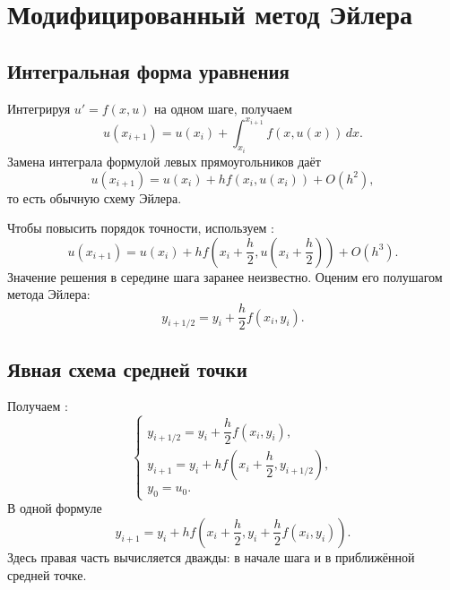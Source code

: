 \documentclass[../final.tex]{subfiles}
\begin{document}
\section{Модифицированный метод Эйлера}

\subsection{Интегральная форма уравнения}

Интегрируя $u'=f(x,u)$ на одном шаге, получаем
\begin{equation*}
    u(x_{i+1})=u(x_i)+\int_{x_i}^{x_{i+1}}f(x,u(x))\,dx.
\end{equation*}
Замена интеграла формулой левых прямоугольников даёт
\begin{equation*}
    u(x_{i+1})=u(x_i)+h f(x_i,u(x_i))+O(h^2),
\end{equation*}
то есть обычную схему Эйлера.

Чтобы повысить порядок точности, используем :
\begin{equation*}
    u(x_{i+1})=u(x_i)
    +h f\!\left(x_i+\frac h2,u\!\left(x_i+\frac h2\right)\right)
    +O(h^3).
\end{equation*}
Значение решения в середине шага заранее неизвестно. Оценим его
полушагом метода Эйлера:
\begin{equation*}
    y_{i+1/2}=y_i+\frac h2 f(x_i,y_i).
\end{equation*}

\subsection{Явная схема средней точки}

Получаем :
\begin{equation*}
    \begin{cases}
        y_{i+1/2}=y_i+\dfrac h2f(x_i,y_i),\\[0.5em]
        y_{i+1}=y_i+h f\!\left(x_i+\dfrac h2,y_{i+1/2}\right),\\[0.5em]
        y_0=u_0.
    \end{cases}
\end{equation*}
В одной формуле
\begin{equation*}
    y_{i+1}=y_i+h f\!\left(x_i+\frac h2,
    y_i+\frac h2 f(x_i,y_i)\right).
\end{equation*}
Здесь правая часть вычисляется дважды: в начале шага и в приближённой
средней точке.
\end{document}
